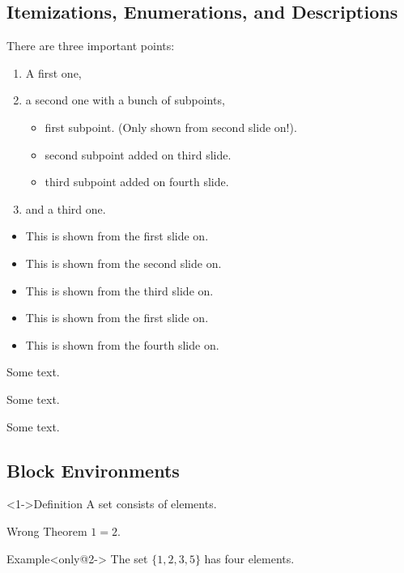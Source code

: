 \subsection{Itemizations, Enumerations, and Descriptions}
\begin{frame}
  There are three important points:
  \begin{enumerate}
  \item<1-> A first one,
  \item<2-> a second one with a bunch of subpoints,
    \begin{itemize}
    \item first subpoint. (Only shown from second slide on!).
    \item<3-> second subpoint added on third slide.
    \item<4-> third subpoint added on fourth slide.
    \end{itemize}
  \item<5-> and a third one.
  \end{enumerate}
\end{frame}
\begin{frame}
\begin{itemize}[<+->]
\item This is shown from the first slide on.
\item This is shown from the second slide on.
\item This is shown from the third slide on.
\item<1-> This is shown from the first slide on.
\item This is shown from the fourth slide on.
\end{itemize}
\end{frame}
\begin{frame}
\begin{description}
\item[short] Some text.
\item[longest label] Some text.
\item[long label] Some text.
\end{description}
\end{frame}
\subsection{Block Environments}
\begin{frame}
	\begin{block}<1->{Definition}
  		A \alert{set} consists of elements.
	\end{block}
	\begin{alertblock}{Wrong Theorem}
  		$1=2$.
	\end{alertblock}
	\begin{exampleblock}{Example}<only@2->
  		The set $\{1,2,3,5\}$ has four elements.
	\end{exampleblock}
\end{frame}
